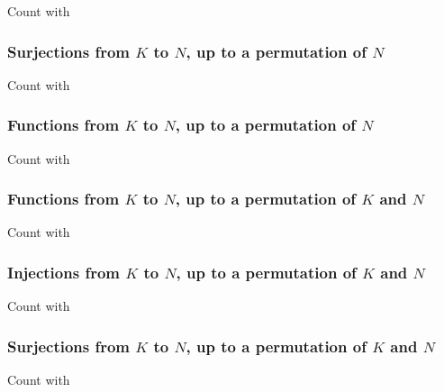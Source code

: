Count with 

\subsubsection{Surjections from $K$ to $N$, up to a permutation of $N$}

Count with 

\subsubsection{Functions from $K$ to $N$, up to a permutation of $N$}

Count with 

\subsubsection{Functions from $K$ to $N$, up to a permutation of $K$ and $N$}

Count with 

\subsubsection{Injections from $K$ to $N$, up to a permutation of $K$ and $N$}

Count with 

\subsubsection{Surjections from $K$ to $N$, up to a permutation of $K$ and $N$}

Count with 
